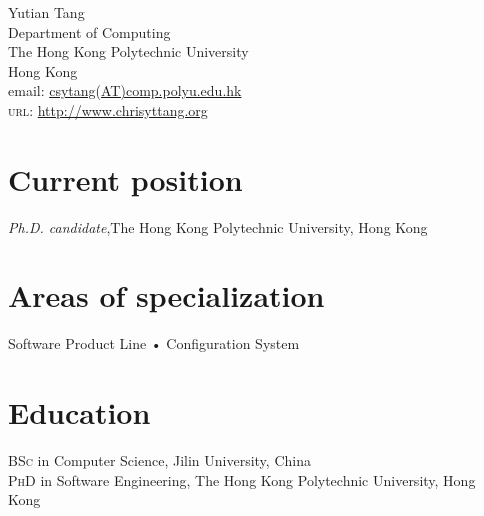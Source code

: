 \documentclass[10pt, a4paper]{article}
\newcommand{\years}[1]{\marginnote{\scriptsize #1}}
\begin{document}
{\LARGE Yutian	Tang}\\[1cm]
 Department of Computing\\
The Hong Kong Polytechnic University\\
Hong Kong \\[.2cm]
email: \href{mailto:csytang@comp.polyu.edu.hk}{csytang(AT)comp.polyu.edu.hk}\\
\textsc{url}: \href{http://www.chrisyttang.org}{http://www.chrisyttang.org}


\section*{Current position}
\emph{Ph.D. candidate},The Hong Kong Polytechnic University, Hong Kong

\section*{Areas of specialization}
 Software Product Line • Configuration System


\section*{Education}
\noindent
\years{2013}\textsc{BSc} in Computer Science, Jilin University, China\\
\years{2017}\textsc{PhD} in Software Engineering, The Hong Kong Polytechnic University, Hong Kong

\end{document}
